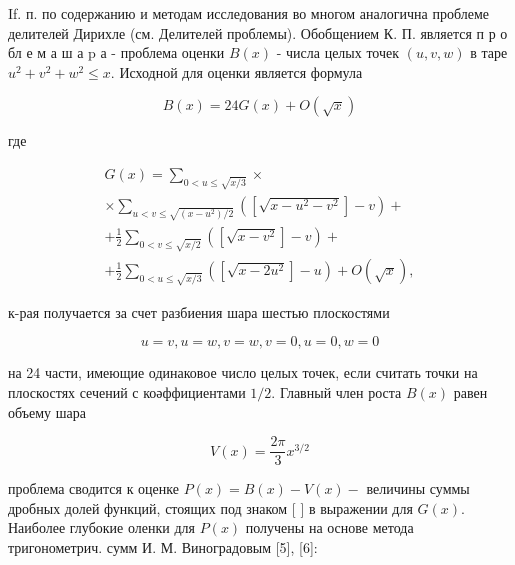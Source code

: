 \documentclass[10pt]{article}
\begin{document}
If. п. по содержанию и методам исследования во многом аналогична проблеме делителей Дирихле (см. Делителей проблемы). Обобщением К. П. является п р о бл е м а ш а $\mathrm{p}$ а - проблема оценки $B(x)$ - числа целых точек $(u, v, w)$ в таре $u^{2}+v^{2}+w^{2} \leqslant x$. Исходной для оценки является формула



\[

B(x)=24 G(x)+O(\sqrt{x})

\]



где



\[

\begin{gathered}

G(x)=\sum_{0<u \leqslant \sqrt{x / 3}} \times \\

\times \sum_{u<v \leqslant \sqrt{\left(x-u^{2}\right) / 2}}\left(\left[\sqrt{x-u^{2}-v^{2}}\right]-v\right)+ \\

+\frac{1}{2} \sum_{0<v \leqslant \sqrt{x / 2}}\left(\left[\sqrt{x-v^{2}}\right]-v\right)+ \\

+\frac{1}{2} \sum_{0<u \leqslant \sqrt{x / 3}}\left(\left[\sqrt{x-2 u^{2}}\right]-u\right)+O(\sqrt{x}),

\end{gathered}

\]



к-рая получается за счет разбиения шара шестью плоскостями



\[

u=v, u=w, v=w, v=0, u=0, w=0

\]



на 24 части, имеющие одинаковое число целых точек, если считать точки на плоскостях сечений с коәффициентами $1 / 2$. Главный член роста $B(x)$ равен объему шара



\[

V(x)=\frac{2 \pi}{3} x^{3 / 2}

\]



проблема сводится к оценке $P(x)=B(x)-V(x)-$ величины суммы дробных долей функций, стоящих под знаком [ ] в выражении для $G(x)$. Наиболее глубокие оленки для $P(x)$ получены на основе метода тригонометрич. сумм И. М. Виноградовым [5], [6]:
\end{document}
